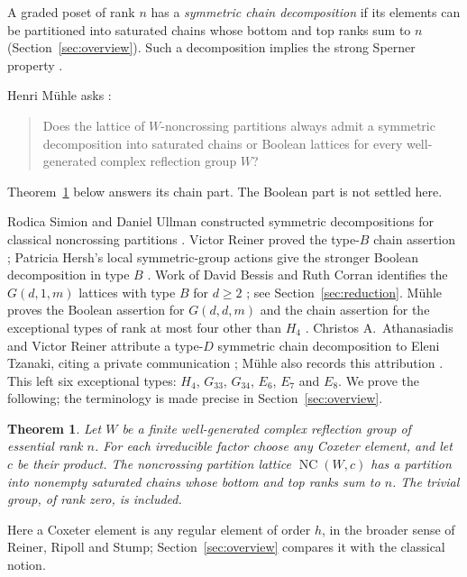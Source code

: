 \documentclass[11pt]{article}
\newtheorem{theorem}{Theorem}[section]
\theoremstyle{definition}
\newcommand{\NC}{\operatorname{NC}}
\begin{document}
A graded poset of rank $n$ has a \emph{symmetric chain decomposition}
if its elements can be partitioned into saturated chains whose bottom
and top ranks sum to $n$ (Section~\ref{sec:overview}). Such a
decomposition implies the strong Sperner property
\cite[remark after Question~1.2]{Muhle}.
\begin{samepage}
Henri M\"uhle asks \cite[Question~1.1]{Muhle}:
\begin{quote}
Does the lattice of $W$-noncrossing partitions always admit a symmetric
decomposition into saturated chains or Boolean lattices for every
well-generated complex reflection group $W$?
\end{quote}
\end{samepage}
Theorem~\ref{thm:main} below answers its chain part. The Boolean part
is not settled here.

Rodica Simion and Daniel Ullman constructed symmetric decompositions
for classical noncrossing partitions \cite{SU}. Victor Reiner proved
the type-$B$ chain assertion \cite[Theorem~13]{Reiner}; Patricia Hersh's
local symmetric-group actions give the stronger Boolean decomposition
in type $B$ \cite[Theorems~5 and~7]{Hersh}. Work of David Bessis and
Ruth Corran identifies the $G(d,1,m)$ lattices with type $B$ for
$d\geq2$ \cite{BC}; see Section~\ref{sec:reduction}. M\"uhle proves the Boolean assertion for
$G(d,d,m)$ and the chain assertion for the exceptional types of rank
at most four other than $H_4$
\cite[Theorem~1.3 and Proposition~4.2]{Muhle}.
Christos A.~Athanasiadis and Victor Reiner attribute a type-$D$ symmetric
chain decomposition to Eleni Tzanaki, citing a private communication
\cite[author manuscript, Section~7, item~4]{AR}; M\"uhle also records this
attribution \cite[introduction, after Theorem~1.3]{Muhle}.
This left six exceptional types: $H_4$, $G_{33}$, $G_{34}$, $E_6$,
$E_7$ and $E_8$. We prove the following; the terminology is made
precise in Section~\ref{sec:overview}.

\begin{theorem}\label{thm:main}
Let $W$ be a finite well-generated complex reflection group of essential
rank $n$. For each irreducible factor choose any Coxeter element, and
let $c$ be their product. The noncrossing partition lattice
$\NC(W,c)$ has a partition into nonempty saturated chains whose
bottom and top ranks sum to $n$. The trivial group, of rank zero, is
included.
\end{theorem}

Here a Coxeter element is any regular element of order $h$, in the
broader sense of Reiner, Ripoll and Stump; Section~\ref{sec:overview}
compares it with the classical notion.
\end{document}
